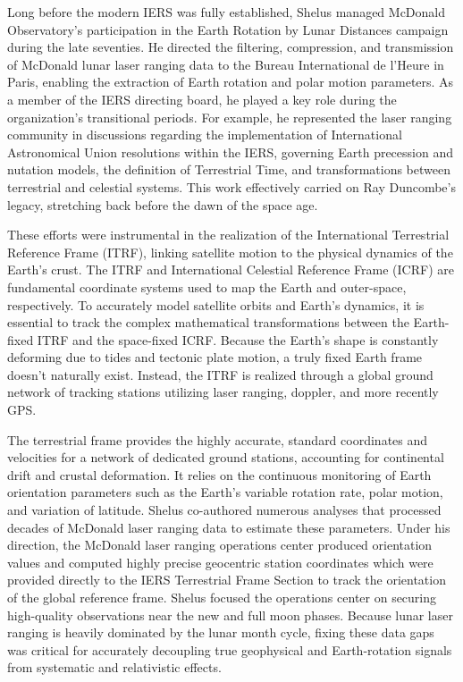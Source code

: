 Long before the modern IERS was fully established, Shelus managed McDonald Observatory's participation in the Earth Rotation by Lunar Distances campaign during the late seventies. He directed the filtering, compression, and transmission of McDonald lunar laser ranging data to the Bureau International de l'Heure in Paris, enabling the extraction of Earth rotation and polar motion parameters. As a member of the IERS directing board, he played a key role during the organization's transitional periods. For example, he represented the laser ranging community in discussions regarding the implementation of International Astronomical Union resolutions within the IERS, governing Earth precession and nutation models, the definition of Terrestrial Time, and transformations between terrestrial and celestial systems. This work effectively carried on Ray Duncombe’s legacy, stretching back before the dawn of the space age.

These efforts were instrumental in the realization of the International Terrestrial Reference Frame (ITRF), linking satellite motion to the physical dynamics of the Earth’s crust. The ITRF and International Celestial Reference Frame (ICRF) are fundamental coordinate systems used to map the Earth and outer-space, respectively. To accurately model satellite orbits and Earth's dynamics, it is essential to track the complex mathematical transformations between the Earth-fixed ITRF and the space-fixed ICRF. Because the Earth’s shape is constantly deforming due to tides and tectonic plate motion, a truly fixed Earth frame doesn't naturally exist. Instead, the ITRF is realized through a global ground network of tracking stations utilizing laser ranging, doppler, and more recently GPS. 

The terrestrial frame provides the highly accurate, standard coordinates and velocities for a network of dedicated ground stations, accounting for continental drift and crustal deformation. It relies on the continuous monitoring of Earth orientation parameters such as the Earth's variable rotation rate, polar motion, and variation of latitude. Shelus co-authored numerous analyses that processed decades of McDonald laser ranging data to estimate these parameters. Under his direction, the McDonald laser ranging operations center produced orientation values and computed highly precise geocentric station coordinates which were provided directly to the IERS Terrestrial Frame Section to track the orientation of the global reference frame. Shelus focused the operations center on securing high-quality observations near the new and full moon phases. Because lunar laser ranging is heavily dominated by the lunar month cycle, fixing these data gaps was critical for accurately decoupling true geophysical and Earth-rotation signals from systematic and relativistic effects.

